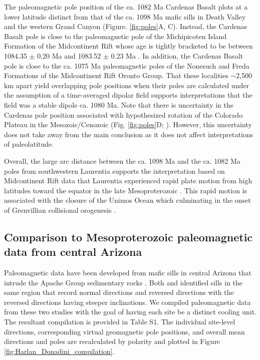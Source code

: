 The paleomagnetic pole position of the ca. 1082 Ma Cardenas Basalt plots at a lower latitude distinct from that of the ca. 1098 Ma mafic sills in Death Valley and the western Grand Canyon (Figure. \ref{fig:poles}A, C). Instead, the Cardenas Basalt pole is close to the paleomagnetic pole of the Michipicoten Island Formation of the Midcontinent Rift whose age is tightly bracketed to be between 1084.35 $\pm$ 0.20 Ma and 1083.52 $\pm$ 0.23 Ma \citep{Fairchild2017a}. In addition, the Cardenas Basalt pole is close to the ca. 1075 Ma paleomagnetic poles of the Nonesuch and Freda Formations \citep{Henry1977a, Slotznick2023a} of the Midcontinent Rift Oronto Group. That these localities $\sim$2,500 km apart yield overlapping pole positions when their poles are calculated under the assumption of a time-averaged dipolar field supports interpretations that the field was a stable dipole ca. 1080 Ma. Note that there is uncertainty in the Cardenas pole position associated with hypothesized rotation of the Colorado Plateau in the Mesozoic/Cenozoic (Fig. \ref{fig:poles}D; ). However, this uncertainty does not take away from the main conclusion as it does not affect interpretations of paleolatitude.

Overall, the large arc distance between the ca. 1098 Ma and the ca. 1082 Ma poles from southwestern Laurentia supports the interpretation based on Midcontinent Rift data that Laurentia experienced rapid plate motion from high latitudes toward the equator in the late Mesoproterozoic \citep{Davis1997a, Swanson-Hysell2009a}. This rapid motion is associated with the closure of the Unimos Ocean which culminating in the onset of Grenvillian collisional orogenesis \citep{Swanson-Hysell2023a}. 

\subsection*{Comparison to Mesoproterozoic paleomagnetic data from central Arizona}

Paleomagnetic data have been developed from mafic sills in central Arizona that intrude the Apache Group sedimentary rocks \citep{Helsley1972a, Harlan1993a, Donadini2011a}. Both \cite{Harlan1993a} and \cite{Donadini2011a} identified sills in the same region that record normal directions and reversed directions with the reversed directions having steeper inclinations. We compiled paleomagnetic data from these two studies with the goal of having each site be a distinct cooling unit. The resultant compilation is provided in Table S1. The individual site-level directions, corresponding virtual geomagnetic pole positions, and overall mean directions and poles are recalculated by polarity and plotted in Figure \ref{fig:Harlan_Donadini_compilation}. 

